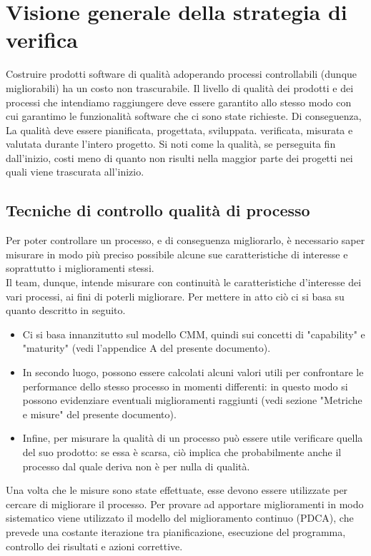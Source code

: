 
\section{Visione generale della strategia di verifica}
	Costruire prodotti software di qualità adoperando processi controllabili (dunque migliorabili) ha un costo non trascurabile. Il livello di qualità 
	dei prodotti e dei processi che intendiamo raggiungere deve essere garantito allo stesso modo con cui garantimo le funzionalità software che ci 
	sono state richieste. Di conseguenza, La qualità deve essere pianificata, progettata, sviluppata. verificata, misurata e valutata durante l'intero 
	progetto. Si noti come la qualità, se perseguita fin dall'inizio, costi meno di quanto non risulti nella maggior parte dei progetti nei quali viene 
	trascurata all'inizio.
	\subsection{Tecniche di controllo qualità di processo}
		Per poter controllare un processo, e di conseguenza migliorarlo, è necessario saper misurare in modo più preciso possibile alcune sue 
		caratteristiche di interesse e soprattutto i miglioramenti stessi.\\
		Il team, dunque, intende misurare con continuità le caratteristiche d'interesse dei vari processi, ai fini di poterli migliorare. Per mettere in 
		atto ciò ci si basa su quanto descritto in seguito.
		\begin{itemize}
			\item Ci si basa innanzitutto sul modello CMM, quindi sui concetti di "capability" e "maturity" (vedi l'appendice A del presente documento).
			\item In secondo luogo, possono essere calcolati alcuni valori utili per confrontare le performance dello stesso processo in momenti 
			differenti: in questo modo si possono evidenziare eventuali miglioramenti raggiunti (vedi sezione "Metriche e misure" del presente documento).
			\item Infine, per misurare la qualità di un processo può essere utile verificare quella del suo prodotto: se essa è scarsa, ciò implica che 
			probabilmente anche il processo dal quale deriva non è per nulla di qualità.
		\end{itemize}
		Una volta che le misure sono state effettuate, esse devono essere utilizzate per cercare di migliorare il processo. Per provare ad apportare 
		miglioramenti in modo sistematico viene utilizzato il modello del miglioramento continuo (PDCA), che prevede una costante iterazione tra 
		pianificazione, esecuzione del programma, controllo dei risultati e azioni correttive.\\
